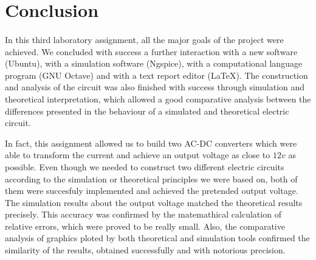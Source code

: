 \section{Conclusion}
\label{sec:conclusion}

\paragraph{}
In this third laboratory assignment, all the major goals of the project were achieved. We concluded with success a further interaction with a new software (Ubuntu), with a simulation software (Ngspice), with a computational language program (GNU Octave) and with a text report editor (LaTeX). The construction and analysis of the circuit was also finished with success through simulation and theoretical interpretation, which allowed a good comparative analysis between the differences presented in the behaviour of a simulated and theoretical electric circuit. 

In fact, this assignment allowed us to build two AC-DC converters which were able to transform the current and achieve an output voltage as close to $12v$ as possible. Even though we needed to construct two different electric circuits according to the simulation or theoretical principles we were based on, both of them were succesfuly implemented and achieved the pretended output voltage. 
The simulation results about the output voltage matched the theoretical results precisely. This accuracy was confirmed by the matemathical calculation of relative errors, which were proved to be really small. Also, the comparative analysis of graphics ploted by both theoretical and simulation tools confirmed the similarity of the results, obtained successfully and with notorious precision.
